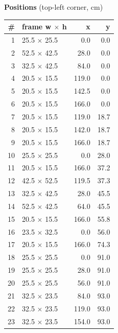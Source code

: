 \documentclass[a4paper,landscape,10pt]{article}
\begin{document}
\begin{minipage}[t]{0.25\textwidth}
\vspace{8pt}
{\bfseries Positions} (top-left corner, cm)\\[2pt]
\tiny
\begin{tabular}{@{}r l r r@{}}
\toprule
\# & frame w $\times$ h & x & y \\
\midrule
1 & 25.5 $\times$ 25.5 & 0.0 & 0.0 \\
2 & 52.5 $\times$ 42.5 & 28.0 & 0.0 \\
3 & 32.5 $\times$ 42.5 & 84.0 & 0.0 \\
4 & 20.5 $\times$ 15.5 & 119.0 & 0.0 \\
5 & 20.5 $\times$ 15.5 & 142.5 & 0.0 \\
6 & 20.5 $\times$ 15.5 & 166.0 & 0.0 \\
7 & 20.5 $\times$ 15.5 & 119.0 & 18.7 \\
8 & 20.5 $\times$ 15.5 & 142.0 & 18.7 \\
9 & 20.5 $\times$ 15.5 & 166.0 & 18.7 \\
10 & 25.5 $\times$ 25.5 & 0.0 & 28.0 \\
11 & 20.5 $\times$ 15.5 & 166.0 & 37.2 \\
12 & 42.5 $\times$ 52.5 & 119.5 & 37.3 \\
13 & 32.5 $\times$ 42.5 & 28.0 & 45.5 \\
14 & 52.5 $\times$ 42.5 & 64.0 & 45.5 \\
15 & 20.5 $\times$ 15.5 & 166.0 & 55.8 \\
16 & 23.5 $\times$ 32.5 & 0.0 & 56.0 \\
17 & 20.5 $\times$ 15.5 & 166.0 & 74.3 \\
18 & 25.5 $\times$ 25.5 & 0.0 & 91.0 \\
19 & 25.5 $\times$ 25.5 & 28.0 & 91.0 \\
20 & 25.5 $\times$ 25.5 & 56.0 & 91.0 \\
21 & 32.5 $\times$ 23.5 & 84.0 & 93.0 \\
22 & 32.5 $\times$ 23.5 & 119.0 & 93.0 \\
23 & 32.5 $\times$ 23.5 & 154.0 & 93.0 \\
\bottomrule
\end{tabular}
\end{minipage}
\clearpage
\end{document}
